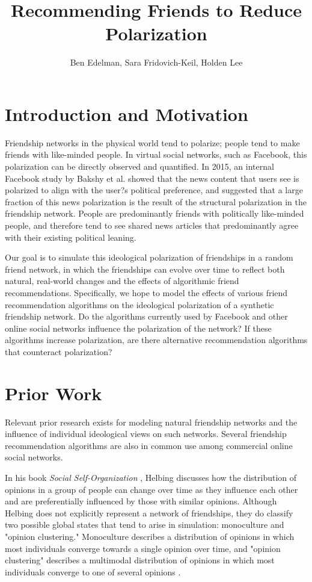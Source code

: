 \documentclass[12pt,letterpaper]{article}
\author{Ben Edelman, Sara Fridovich-Keil, Holden Lee}
\title{Recommending Friends to Reduce Polarization}
\begin{document}
\maketitle

\section{Introduction and Motivation}
Friendship networks in the physical world tend to polarize; people tend to make friends with like-minded people. In virtual social networks, such as Facebook, this polarization can be directly observed and quantified. In 2015, an internal Facebook study by Bakshy et al. \cite{bakshy} showed that the news content that users see is polarized to align with the user?s political preference, and suggested that a large fraction of this news polarization is the result of the structural polarization in the friendship network. People are predominantly friends with politically like-minded people, and therefore tend to see shared news articles that predominantly agree with their existing political leaning. 

Our goal is to simulate this ideological polarization of friendships in a random friend network, in which the friendships can evolve over time to reflect both natural, real-world changes and the effects of algorithmic friend recommendations. Specifically, we hope to model the effects of various friend recommendation algorithms on the ideological polarization of a synthetic friendship network. Do the algorithms currently used by Facebook and other online social networks influence the polarization of the network? If these algorithms increase polarization, are there alternative recommendation algorithms that counteract polarization? 


\section{Prior Work}

Relevant prior research exists for modeling natural friendship networks and the influence of individual ideological views on such networks. Several friendship recommendation algorithms are also in common use among commercial online social networks. 

In his book \textit{Social Self-Organization} \cite{helbing}, Helbing discusses how the distribution of opinions in a group of people can change over time as they influence each other and are preferentially influenced by those with similar opinions. Although Helbing does not explicitly represent a network of friendships, they do classify two possible global states that tend to arise in simulation: monoculture and "opinion clustering." Monoculture describes a distribution of opinions in which most individuals converge towards a single opinion over time, and "opinion clustering" describes a multimodal distribution of opinions in which most individuals converge to one of several opinions \cite{helbing}.
\end{document}
